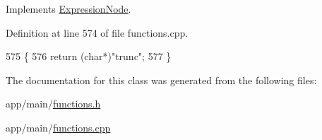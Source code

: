 Implements \hyperlink{classExpressionNode_a42a5e9562b0f645a19dcc83f698069b5}{Expression\+Node}.



Definition at line 574 of file functions.\+cpp.


\begin{DoxyCode}
575 \{
576     \textcolor{keywordflow}{return} (\textcolor{keywordtype}{char}*)\textcolor{stringliteral}{"trunc"};
577 \}
\end{DoxyCode}


The documentation for this class was generated from the following files\+:\begin{DoxyCompactItemize}
\item 
app/main/\hyperlink{functions_8h}{functions.\+h}\item 
app/main/\hyperlink{functions_8cpp}{functions.\+cpp}\end{DoxyCompactItemize}

